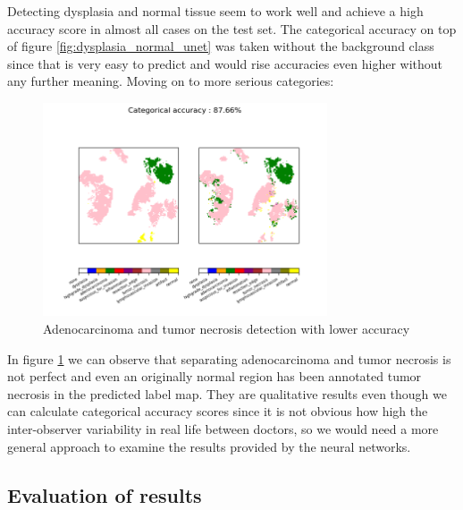 \documentclass[a4paper,12pt]{article}
\begin{document}
\vspace{4mm}

\par Detecting dysplasia and normal tissue seem to work well and achieve a high accuracy score in almost all cases on the test set. The categorical accuracy on top of figure \ref{fig:dysplasia_normal_unet} was taken without the background class since that is very easy to predict and would rise accuracies even higher without any further meaning. Moving on to more serious categories:

\vspace{4mm}

\begin{figure}[H]
    \centering
    \includegraphics[width=0.75\textwidth]{results/046_19_8538.png}
    \caption{Adenocarcinoma and tumor necrosis detection with lower accuracy}
    \label{fig:adeno_tumor_unet}
\end{figure}

\vspace{4mm}

\par In figure \ref{fig:adeno_tumor_unet} we can observe that separating adenocarcinoma and tumor necrosis is not perfect and even an originally normal region has been annotated tumor necrosis in the predicted label map. They are qualitative results even though we can calculate categorical accuracy scores since it is not obvious how high the inter-observer variability in real life between doctors, so we would need a more general approach to examine the results provided by the neural networks.

\vspace{7mm}

\subsection{Evaluation of results}
\end{document}
